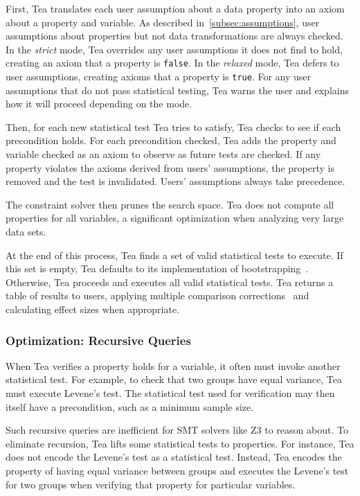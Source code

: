 First, Tea translates each user assumption about a data property into an axiom
about a property and variable. As described in~\autoref{subsec:assumptions}, user
assumptions about properties but not data transformations are always checked. In
the \textit{strict} mode, Tea overrides any user assumptions it does not find to
hold, creating an axiom that a property is \texttt{false}. In the \textit{relaxed} mode, Tea
    defers to user assumptions, creating axioms that a property is \texttt{true}. For
any user assumptions that do not pass statistical testing, Tea warns the user and explains
how it will proceed depending on the mode.

Then, for each new statistical test Tea tries to satisfy, Tea checks to see if
each precondition holds. For each precondition checked, Tea adds the property
and variable checked as an axiom to observe as future tests are checked. If any
property violates the axioms derived from users' assumptions, the property is
removed and the test is invalidated. Users' assumptions
always take precedence.

The constraint solver then prunes the search space. Tea does not compute all
properties for all variables, a significant optimization when
analyzing very large data sets.

At the end of this process, Tea finds a set of valid statistical tests
to execute. If this set is empty, Tea defaults to its implementation
of bootstrapping~\cite{efron1992bootstrap}. Otherwise, Tea proceeds
and executes all valid statistical tests. Tea returns a table of
results to users, applying multiple comparison corrections~\cite{holm1979simple} and
calculating effect sizes when appropriate.

\subsubsection{Optimization: Recursive Queries}
When Tea verifies a property holds for a variable, it often must invoke another
statistical test. For example, to check that two groups have equal variance,
Tea must execute Levene's test. The statistical test used for
verification may then itself have a precondition, such as a minimum sample size.

Such recursive queries are inefficient for SMT solvers like Z3 to reason
about. To eliminate recursion, Tea lifts some statistical tests to properties.
For instance, Tea does not encode the Levene's test as a statistical test.
Instead, Tea encodes the property of having equal variance between groups and
executes the Levene's test for two groups when verifying that property for particular variables.

